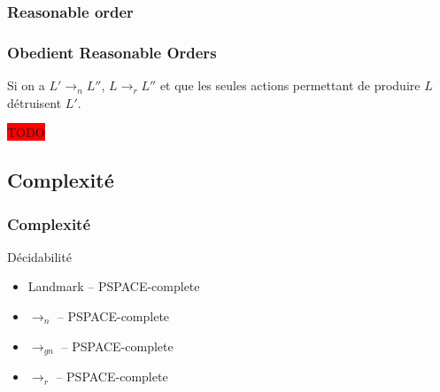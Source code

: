 \begin{frame}
  \frametitle{Reasonable order}

%
\end{frame}
  

\begin{frame}
  \frametitle{Obedient Reasonable Orders}

  \begin{example}
    Si on a $L' \rightarrow_n L''$, $L \rightarrow_r L''$ et que les seules actions permettant de produire $L$ détruisent $L'$.

    \colorbox{red}{TODO}
  \end{example}
\end{frame}

  \subsection{Complexité}
\begin{frame}
  \frametitle{Complexité}
  \begin{block}{Décidabilité}
    \begin{itemize}
      \item Landmark -- PSPACE-complete
      \item $\rightarrow_n$ -- PSPACE-complete
      \item $\rightarrow_{gn}$ -- PSPACE-complete
      \item $\rightarrow_{r}$ -- PSPACE-complete
    \end{itemize}
  \end{block}
\end{frame}

